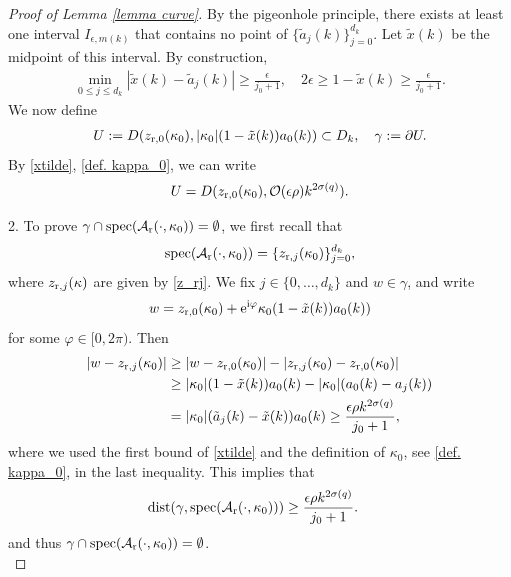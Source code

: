 \documentclass[12pt]{amsart}
\newcommand{\e}{{\rm e}}
\newcommand\eps{\epsilon}
\newcommand{\dist}{\mathrm{dist}}
\newcommand\I{\mathrm{i}}
\DeclareMathOperator{\spec}{spec}
\begin{document}
\begin{proof}[Proof of Lemma \ref{lemma curve}]
By the pigeonhole principle, there exists at least one interval $I_{\eps,m(k)}$ that contains no point of $\{\tilde{a}_j(k)\}_{j=0}^{d_k}$. Let $\tilde{x}(k)$ be the midpoint of this interval. By construction,
\begin{align}\label{xtilde}
    \min_{0\leq j\leq d_k}|\tilde{x}(k)-\tilde{a}_j(k)|\geq \frac{\eps}{j_0+1},\quad 2\eps\geq 1-\tilde{x}(k)\geq \frac{\eps}{j_0+1}.
\end{align}
We now define 
\begin{align}\label{def. U(k,eps)}
    U:=D(z_{{\rm r},0}(\kappa_{0}),|\kappa_{0}|(1-\tilde{x}(k))a_0(k))\subset D_k,\quad \gamma:=\partial U.
\end{align}
By \eqref{xtilde}, \eqref{def. kappa_0}, we can write
\begin{align}\label{def. U(k,eps) 2}
    U=D(z_{{\rm r},0}(\kappa_{0}),\mathcal{O}(\eps\rho) k^{2\sigma(q)}).
\end{align}

2. To prove $\gamma\cap \spec(\mathcal{A}_{\rm r}(\cdot,\kappa_0))=\emptyset$, we first recall that
\begin{align}
 \spec(\mathcal{A}_{\rm r}(\cdot,\kappa_{0}))=\{z_{{\rm r},j}(\kappa_{0})\}_{j=0}^{d_k},   
\end{align}
where $z_{{\rm r},j}(\kappa)$ are given by \eqref{z_rj}. We fix $j\in \{0,\ldots,d_k\}$ and $w\in\gamma$, and write
\begin{align}\label{w in gamma}
    w=z_{{\rm r},0}(\kappa_{0})+\e^{\I\varphi}\kappa_{0}(1-\tilde{x}(k))a_0(k))
\end{align}
for some $\varphi\in [0,2\pi)$. Then
\begin{align}\label{w-zrj}
    |w-z_{{\rm r},j}(\kappa_{0})|&\geq |w-z_{{\rm r},0}(\kappa_{0})|-|z_{{\rm r},j}(\kappa_{0})-z_{{\rm r},0}(\kappa_{0})|\\
    &\geq |\kappa_{0}|(1-\tilde{x}(k))a_0(k)-|\kappa_{0}|(a_0(k)-a_j(k))\\
    &=|\kappa_{0}|(\tilde{a}_j(k)-\tilde{x}(k))a_0(k)
    \geq \frac{\eps \rho k^{2\sigma(q)}}{j_0+1},
\end{align}
where we used the first bound of \eqref{xtilde} and the definition of $\kappa_0$, see \eqref{def. kappa_0}, in the last inequality. This implies that
\begin{align}
    \dist(\gamma,\spec(\mathcal{A}_{\rm r}(\cdot,\kappa_{0})))&\geq \frac{\eps \rho k^{2\sigma(q)}}{j_0+1}.\label{distance to curve bounded below}
\end{align}
and thus $\gamma\cap \spec(\mathcal{A}_{\rm r}(\cdot,\kappa_0))=\emptyset$.\\


\end{proof}
\end{document}
